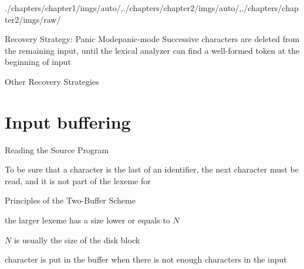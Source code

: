 \begin{graphicspathcontext}{{./chapters/chapter1/imgs/auto/},{./chapters/chapter2/imgs/auto/},{./chapters/chapter2/imgs/raw/}}
\begin{bibunit}[apalike]
\begin{leftlawnframe}{{Recovery Strategy:} Panic Mode}{panic-mode}
	Successive characters are deleted from the remaining input, until the lexical analyzer can find a well-formed token at the beginning of input
\end{leftlawnframe}

\begin{gridframe}{{Other} Recovery Strategies}
\end{gridframe}

\section{Input buffering}
\sectiontableofcontentslide

\begin{frame}{Reading the Source Program}
	\begin{rightarrowsequence}
	\end{rightarrowsequence}
	\vspace{.25cm}
	\begin{example}
		To be sure that a character is the last of an identifier, the next character must be read, and it is not part of the lexeme for 
	\end{example}
\end{frame}

\begin{frame}{Principles of the Two-Buffer Scheme}
	\begin{center}
		{}
	\end{center}
	\vspace{.25cm}
	\begin{description}
		\item[Assumption] the larger lexeme has a size lower or equals to $N$
		\item $N$ is usually the size of the disk block
		\item {} character is put in the buffer when there is not enough characters in the input
	\end{description}
	\vspace{1cm}
\end{frame}


\end{bibunit}
\end{graphicspathcontext}
